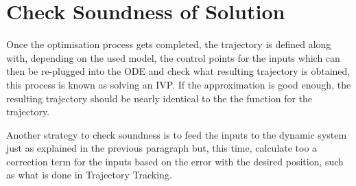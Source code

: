 \section{Check Soundness of Solution}
\label{sec:ivproblem}

\par Once the optimisation process gets completed, the trajectory is defined along with, depending on the used model, the control points for the inputs which can then be re-plugged into the \ac{ODE} and check what resulting trajectory is obtained, this process is known as solving an \ac{IVP}. If the approximation is good enough, the resulting trajectory should be nearly identical to the the function for the trajectory. 
\par Another strategy to check soundness is to feed the inputs to the dynamic system just as explained in the previous paragraph but, this time, calculate too a correction term for the inputs based on the error with the desired position, such as what is done in Trajectory Tracking.
